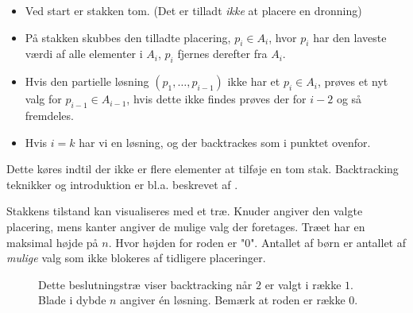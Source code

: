 \documentclass[final,a4paper,11pt]{article}
\begin{document}
\begin{itemize}
\item Ved start er stakken tom. (Det er tilladt \emph{ikke} at placere en dronning)
\item På stakken skubbes den tilladte placering, $p_i \in A_i$, hvor $p_i$ har den laveste værdi af alle elementer i $A_i$, $p_i$ fjernes derefter fra $A_i$.
\item Hvis den partielle løsning $(p_1,\ldots,p_{i-1})$ ikke har et $p_i \in A_i$, prøves et nyt valg for $p_{i-1} \in A_{i-1}$, hvis dette ikke findes prøves der for $i-2$ og så fremdeles. 
\item Hvis $i=k$ har vi en løsning, og der backtrackes som i punktet ovenfor.
\end{itemize}
Dette køres indtil der ikke er flere elementer at tilføje en tom stak.
Backtracking teknikker og introduktion er bl.a. beskrevet af \cite{Golomb72}.

Stakkens tilstand kan visualiseres med et træ. Knuder angiver den valgte placering, mens kanter angiver de mulige valg der foretages. Træet har en maksimal højde på $n$. Hvor højden for roden er "0". Antallet af børn er antallet af \emph{mulige} valg som ikke blokeres af tidligere placeringer. 

\begin{figure}[!h]
\begin{center}

\begin{tikzpicture}
\end{tikzpicture}
	
\end{center}
\end{figure}



\begin{figure}[!h]
\begin{center}
	


\caption{
Dette beslutningstræ viser backtracking når $2$ er valgt i række $1$. Blade i dybde $n$ angiver én løsning. Bemærk at roden er række 0.}
\label{fig:tree}
\end{center}
\end{figure}
\end{document}

